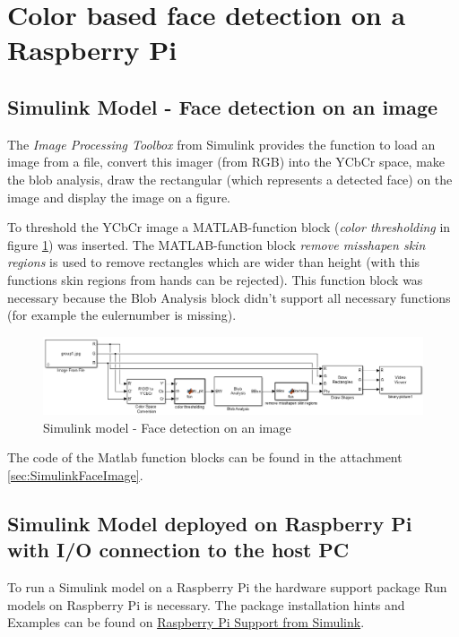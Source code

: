 \documentclass[Bachelorarbeit.tex]{subfiles}
\begin{document}
\section{Color based face detection on a Raspberry Pi}

\subsection{Simulink Model - Face detection on an image}
The \textit{Image Processing Toolbox } from Simulink provides the function to load an image from a file, convert this imager (from RGB) into the YCbCr space, make the blob analysis, draw the rectangular (which represents a detected face) on the image and display the image on a figure. 

To threshold the YCbCr image a MATLAB-function block (\textit{color thresholding} in figure \ref{SimulinkImage}) was inserted. The MATLAB-function block \textit{remove misshapen skin regions} is used to remove rectangles which are wider than height (with this functions skin regions from hands can be rejected). This function block was necessary because the Blob Analysis block didn't support all necessary functions (for example the eulernumber is missing).
\begin{figure}[!h]
\centering
\includegraphics[width=14cm]{./img/simulink/Simulink_ImageProcessing.PNG} 
\caption{Simulink model - Face detection on an image}
\label{SimulinkImage}
\end{figure}

The code of the Matlab function blocks can be found in the attachment \ref{sec:SimulinkFaceImage}.


\subsection{Simulink Model deployed on Raspberry Pi with I/O connection to the host PC}

To run a Simulink model on a Raspberry Pi the hardware support package Run models on Raspberry Pi is necessary. The package installation hints and Examples can be found on \href{https://de.mathworks.com/hardware-support/raspberry-pi-simulink.html}{Raspberry Pi Support from Simulink}. 
\end{document}
